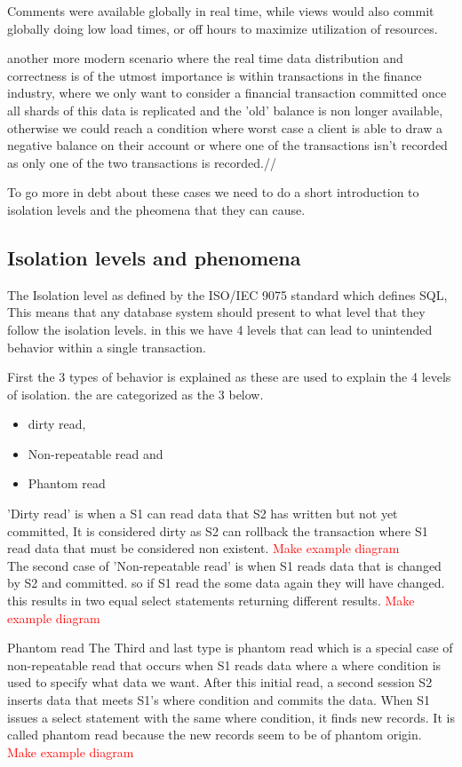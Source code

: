 \documentclass[a4paper,10pt,titlepage]{report}
\begin{document}
Comments were available globally in real time, while views would also commit globally doing low load times, or off hours to maximize utilization of resources.

another more modern scenario where the real time data distribution and correctness is of the utmost importance is within transactions in the finance industry,  where we only want to consider a financial transaction committed once all shards of this data is replicated and the 'old' balance is non longer available, otherwise we could reach a condition where worst case a client is able to draw a negative balance on their account or where one of the transactions isn't recorded as only one of the two transactions is recorded.//

To go more in debt about these cases we need to do a short introduction to isolation levels and the pheomena that they can cause.


\subsection{Isolation levels and phenomena}

The Isolation level as defined by the ISO/IEC 9075 standard which defines SQL, This means that any database system should present to what level that they follow the isolation levels. in this we have 4 levels that can lead to unintended behavior within a single transaction. 

First the 3 types of behavior is explained as these are used to explain the 4 levels of isolation. the are categorized as the 3 below.
\begin{itemize}
\item dirty read,
\item Non-repeatable read and
\item Phantom read
\end{itemize}

'Dirty read' is when a S1 can read data that S2 has written but not yet committed, It is considered dirty as S2 can rollback the transaction where S1 read data that must be considered non existent. \textcolor{red}{Make example diagram} 
\\
The second case of 'Non-repeatable read' is when S1 reads data that is changed by S2 and committed. so if S1 read the some data again they will have changed. this results in two equal select statements returning different results.  \textcolor{red}{Make example diagram} 

Phantom read
The Third and last type is phantom read which is a special case of non-repeatable read that occurs when S1 reads data where a where condition is used to specify what data we want. After this initial read, a second session S2 inserts data that meets S1's where condition and commits the data. When S1 issues a select statement with the same where condition, it finds new records. It is called phantom read because the new records seem to be of phantom origin.
 \textcolor{red}{Make example diagram} 
\end{document}
